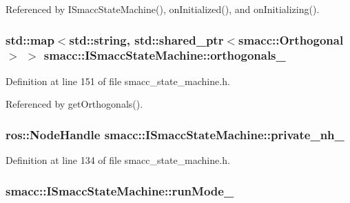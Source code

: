 Referenced by I\+Smacc\+State\+Machine(), on\+Initialized(), and on\+Initializing().

\subsubsection[{\texorpdfstring{orthogonals\+\_\+}{orthogonals_}}]{\setlength{\rightskip}{0pt plus 5cm}std\+::map$<$std\+::string, std\+::shared\+\_\+ptr$<${\bf smacc\+::\+Orthogonal}$>$ $>$ smacc\+::\+I\+Smacc\+State\+Machine\+::orthogonals\+\_\+\hspace{0.3cm}{\ttfamily [protected]}}\hypertarget{classsmacc_1_1ISmaccStateMachine_ae8e5c25d0aecd91fe496df13751bc667}{}\label{classsmacc_1_1ISmaccStateMachine_ae8e5c25d0aecd91fe496df13751bc667}


Definition at line 151 of file smacc\+\_\+state\+\_\+machine.\+h.



Referenced by get\+Orthogonals().

\subsubsection[{\texorpdfstring{private\+\_\+nh\+\_\+}{private_nh_}}]{\setlength{\rightskip}{0pt plus 5cm}ros\+::\+Node\+Handle smacc\+::\+I\+Smacc\+State\+Machine\+::private\+\_\+nh\+\_\+\hspace{0.3cm}{\ttfamily [protected]}}\hypertarget{classsmacc_1_1ISmaccStateMachine_a9c6a5c647ecca6599589c12fdcd53bfc}{}\label{classsmacc_1_1ISmaccStateMachine_a9c6a5c647ecca6599589c12fdcd53bfc}


Definition at line 134 of file smacc\+\_\+state\+\_\+machine.\+h.

\subsubsection[{\texorpdfstring{run\+Mode\+\_\+}{runMode_}}]{ smacc\+::\+I\+Smacc\+State\+Machine\+::run\+Mode\+\_\+\hspace{0.3cm}{\ttfamily [private]}}\hypertarget{classsmacc_1_1ISmaccStateMachine_a9f8cfbf577f7ae7a48b7a328e2e6b589}{}\label{classsmacc_1_1ISmaccStateMachine_a9f8cfbf577f7ae7a48b7a328e2e6b589}


